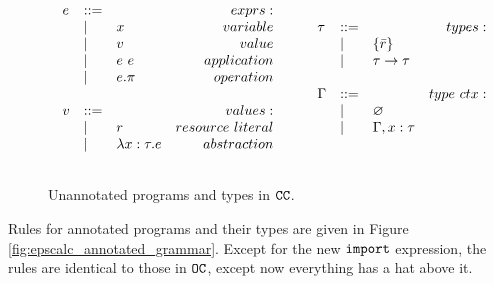 \begin{figure}[h]
\vspace{-5pt}

\[
\begin{array}{lll}

\begin{array}{lllr}
e & ::= & ~ & exprs: \\
	& | & x & variable \\
	& | & v & value \\
	& | & e ~ e & application \\
	& | & e.\pi & operation \\
	&&\\

v & ::= & ~ & values: \\
	& | & r & resource~literal \\
	& | & \lambda x: \tau.e & abstraction \\
	&&\\
\end{array}

\hspace{5ex}

\begin{array}{lllr}

\tau & ::= & ~ & types: \\
		& | & \{ \bar r \} \\
		& | & \tau \rightarrow \tau \\ 
		&&\\

\Gamma & ::= & ~ & type~ctx: \\
				& | & \varnothing \\
				& | & \Gamma, x: \tau \\
				&&\\
				
\end{array}

\end{array}
\]

\vspace{-7pt}
\caption{Unannotated programs and types in $\mathtt{CC}$.}
\label{fig:epscalc_unannotated_grammar}
\end{figure}


Rules for annotated programs and their types are given in Figure \ref{fig:epscalc_annotated_grammar}. Except for the new $\mathtt{import}$ expression, the rules are identical to those in $\mathtt{OC}$, except now everything has a hat above it.

